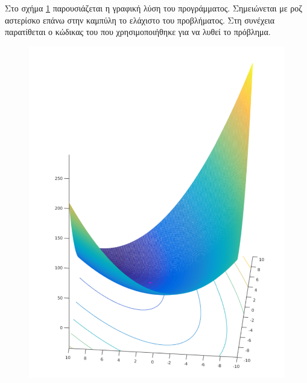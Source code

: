 Στο σχήμα \ref{fig:qp} παρουσιάζεται η γραφική λύση του προγράμματος. Σημειώνεται
με ροζ αστερίσκο επάνω στην καμπύλη το ελάχιστο του προβλήματος. Στη συνέχεια
παρατίθεται ο κώδικας του  που χρησιμοποιήθηκε για να λυθεί το πρόβλημα.
\newpage
\begin{otherlanguage}{english}
    \begin{figure}[h!]
        \centering
        \includegraphics[width=\textwidth]{figures/qp.pdf}
        \caption{}\label{fig:qp}
    \end{figure}
\end{otherlanguage}

\begin{otherlanguage}{english}
    
\end{otherlanguage}
